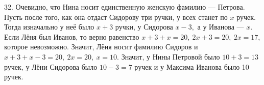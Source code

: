 32. Очевидно, что Нина носит единственную женскую фамилию --- Петрова. Пусть после того, как она отдаст Сидорову три ручки, у всех станет по $x$ ручек. Тогда изначально у неё было $x+3$ ручки, у Сидорова $x-3,$ а у Иванова --- $x.$ Если Лёня был Иванов, то верно равенство $x+3+x=20,\ 2x+3=20,\ 2x=17,$ которое невозможно. Значит, Лёня носит фамилию Сидоров и $x+3+x-3=20,\ 2x=20,\ x=10.$ Значит, у Нины Петровой было $10+3=13$ ручек, у Лёни Сидорова было $10-3=7$ ручек и у Максима Иванова было 10 ручек.\\
